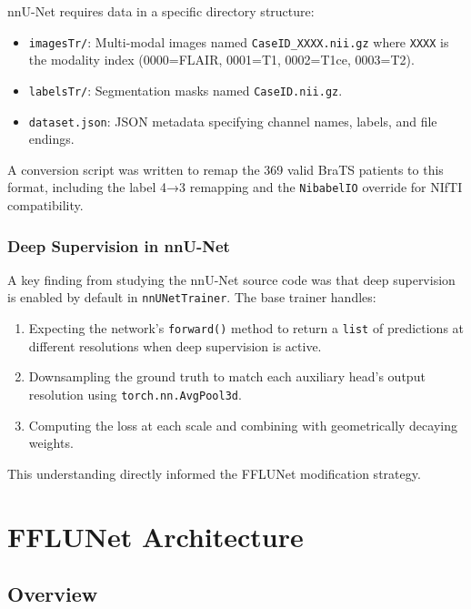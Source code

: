 \documentclass[12pt,a4paper]{report}
\begin{document}
nnU-Net requires data in a specific directory structure:
\begin{itemize}[leftmargin=*]
    \item \texttt{imagesTr/}: Multi-modal images named \texttt{CaseID\_XXXX.nii.gz} where \texttt{XXXX} is the modality index (0000=FLAIR, 0001=T1, 0002=T1ce, 0003=T2).
    \item \texttt{labelsTr/}: Segmentation masks named \texttt{CaseID.nii.gz}.
    \item \texttt{dataset.json}: JSON metadata specifying channel names, labels, and file endings.
\end{itemize}

A conversion script was written to remap the 369 valid BraTS patients to this format, including the label 4→3 remapping and the \texttt{NibabelIO} override for NIfTI compatibility.

\subsection{Deep Supervision in nnU-Net}

A key finding from studying the nnU-Net source code was that deep supervision is enabled by default in \texttt{nnUNetTrainer}. The base trainer handles:
\begin{enumerate}[leftmargin=*]
    \item Expecting the network's \texttt{forward()} method to return a \texttt{list} of predictions at different resolutions when deep supervision is active.
    \item Downsampling the ground truth to match each auxiliary head's output resolution using \texttt{torch.nn.AvgPool3d}.
    \item Computing the loss at each scale and combining with geometrically decaying weights.
\end{enumerate}

This understanding directly informed the FFLUNet modification strategy.

\chapter{FFLUNet Architecture}

\section{Overview}
\end{document}
